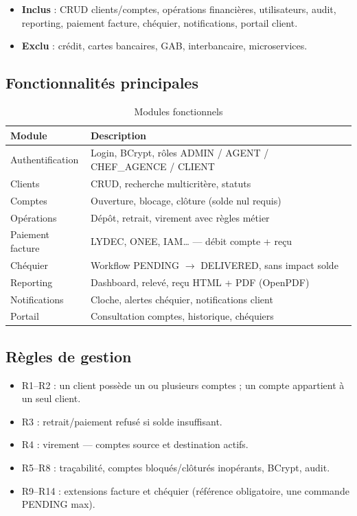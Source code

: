 \begin{itemize}[leftmargin=*]
    \item \textbf{Inclus} : CRUD clients/comptes, opérations financières, utilisateurs, audit, reporting, paiement facture, chéquier, notifications, portail client.
    \item \textbf{Exclu} : crédit, cartes bancaires, GAB, interbancaire, microservices.
\end{itemize}

\subsection{Fonctionnalités principales}

\begin{table}[H]
    \centering
    \caption{Modules fonctionnels}
    \label{tab:fonctionnalites}
    \small
    \begin{tabular}{@{}p{3cm}p{9.5cm}@{}}
        \toprule
        \textbf{Module} & \textbf{Description} \\
        \midrule
        Authentification & Login, BCrypt, rôles ADMIN / AGENT / CHEF\_AGENCE / CLIENT \\
        Clients & CRUD, recherche multicritère, statuts \\
        Comptes & Ouverture, blocage, clôture (solde nul requis) \\
        Opérations & Dépôt, retrait, virement avec règles métier \\
        Paiement facture & LYDEC, ONEE, IAM… — débit compte + reçu \\
        Chéquier & Workflow PENDING $\rightarrow$ DELIVERED, sans impact solde \\
        Reporting & Dashboard, relevé, reçu HTML + PDF (OpenPDF) \\
        Notifications & Cloche, alertes chéquier, notifications client \\
        Portail & Consultation comptes, historique, chéquiers \\
        \bottomrule
    \end{tabular}
\end{table}

\subsection{Règles de gestion}

\begin{itemize}[leftmargin=*]
    \item R1--R2 : un client possède un ou plusieurs comptes ; un compte appartient à un seul client.
    \item R3 : retrait/paiement refusé si solde insuffisant.
    \item R4 : virement — comptes source et destination actifs.
    \item R5--R8 : traçabilité, comptes bloqués/clôturés inopérants, BCrypt, audit.
    \item R9--R14 : extensions facture et chéquier (référence obligatoire, une commande PENDING max).
\end{itemize}

